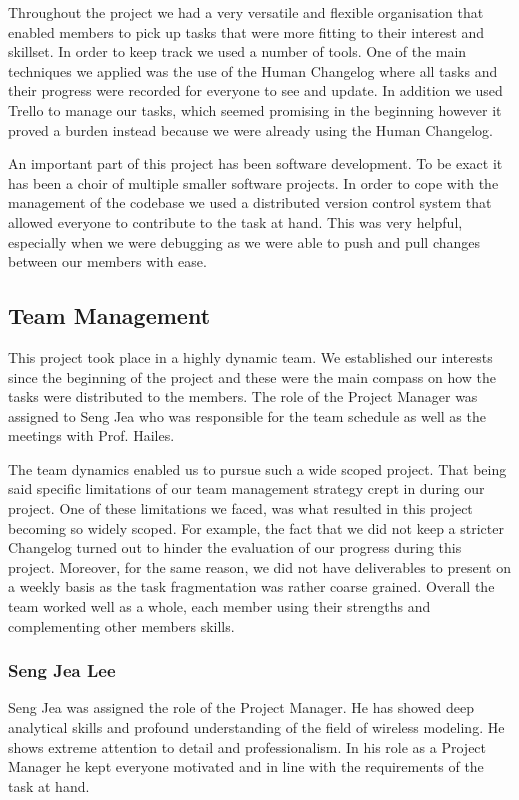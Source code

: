 Throughout the project we had a very versatile and flexible organisation that
enabled members to pick up tasks that were more fitting to their interest and
skillset. In order to keep track we used a number of tools. One of the main
techniques we applied was the use of the Human Changelog where all tasks and
their progress were recorded for everyone to see and update. In addition we used
Trello to manage our tasks, which seemed promising in the beginning however it
proved a burden instead because we were already using the Human Changelog.

An important part of this project has been software development. To be exact it
has been a choir of multiple smaller software projects. In order to cope with
the management of the codebase we used a distributed version control system that
allowed everyone to contribute to the task at hand. This was very helpful,
especially when we were debugging as we were able to push and pull changes
between our members with ease.


\subsection{Team Management}
This project took place in a highly dynamic team. We established our interests
since the beginning of the project and these were the main compass on how the
tasks were distributed to the members. The role of the Project Manager was
assigned to Seng Jea who was responsible for the team schedule as well as the
meetings with Prof. Hailes.

The team dynamics enabled us to pursue such a wide scoped project. That being
said specific limitations of our team management strategy crept in during our
project. One of these limitations we faced, was what resulted in this project
becoming so widely scoped. For example, the fact that we did not keep a stricter
Changelog turned out to hinder the evaluation of our progress during this
project. Moreover, for the same reason, we did not have deliverables to present
on a weekly basis as the task fragmentation was rather coarse grained. Overall
the team worked well as a whole, each member using their strengths and
complementing other members skills.

\subsubsection{Seng Jea Lee}
Seng Jea was assigned the role of the Project Manager. He has showed deep
analytical skills and profound understanding of the field of wireless modeling.
He shows extreme attention to detail and professionalism. In his role as a
Project Manager he kept everyone motivated and in line with the requirements of
the task at hand.

